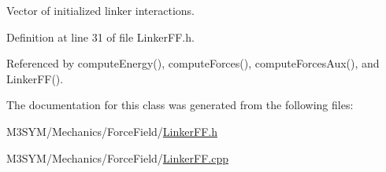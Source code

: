 Vector of initialized linker interactions. 



Definition at line 31 of file Linker\+F\+F.\+h.



Referenced by compute\+Energy(), compute\+Forces(), compute\+Forces\+Aux(), and Linker\+F\+F().



The documentation for this class was generated from the following files\+:\begin{DoxyCompactItemize}
\item 
M3\+S\+Y\+M/\+Mechanics/\+Force\+Field/\hyperlink{LinkerFF_8h}{Linker\+F\+F.\+h}\item 
M3\+S\+Y\+M/\+Mechanics/\+Force\+Field/\hyperlink{LinkerFF_8cpp}{Linker\+F\+F.\+cpp}\end{DoxyCompactItemize}
